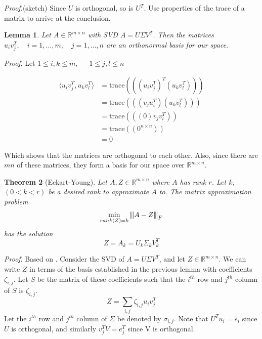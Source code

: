 \documentclass[a4paper]{article}
\newcommand{\norm}[1]{{\left\vert\kern-0.25ex\left\vert\kern-0.25ex\left\vert #1 
    \right\vert\kern-0.25ex\right\vert\kern-0.25ex\right\vert}}
\newcommand{\trace}[1]{\text{trace}(#1)}
\newtheorem{theorem}{Theorem}[section]
\newtheorem{lemma}[theorem]{Lemma}
\begin{document}
\textit{Proof.}(sketch)
Since $U$ is orthogonal, so is $U^T$.  Use properties of the trace of a matrix to arrive at the conclusion.



\begin{lemma}
Let $A \in \mathbb{R}^{m\times n}$ with SVD $A=U\Sigma V^T$.  Then the matrices 
$u_i v_j^T, \quad i=1,...,m, \quad j=1,...,n$
are an orthonormal basis for our space.
\end{lemma}
\textit{Proof}. Let $1 \leq i,k \leq m$, $\quad$ $1 \leq j,l \leq n$ 

\begin{align*}
\langle u_i v_j^T, u_k v_l^T  \rangle &= \trace{((u_i v_j^T)^T(u_k v_l^T))}\\
&= \trace{((v_j u_i^T)(u_k v_l^T))}\\
&= \trace{((0)v_j v_l^T)}\\
&= \trace{(0^{n \times n})}\\
&= 0
\end{align*}

Which shows that the matrices are orthogonal to each other.  Also, since there are $mn$ of these matrices, they form a basis for our space over $\mathbb{R}^{m\times n}$.

\begin{theorem}[Eckart-Young]
Let $A,Z\in \mathbb{R}^{m\times n}$ where $A$ has rank $r$. Let $k$, $(0<k<r)$ be a desired rank to approximate $A$ to. The matrix approximation problem
$$\min_{rank(Z)=k} \norm{A-Z}_F$$
has the solution
$$Z=A_k = U_k\Sigma _k V_k^T$$
\end{theorem}

\textit{Proof}.
Based on \cite{elden}.  Consider the SVD of $A=U\Sigma V^T$, and let $Z\in \mathbb{R}^{m\times n}$. We can write $Z$ in terms of the basis established in the previous lemma with coefficients $\zeta_{i,j}$.  Let $S$ be the matrix of these coefficients such that the $i^{th}$ row and $j^{th}$ column of $S$ is $\zeta_{i,j}$.
$$Z = \sum_{i,j} \zeta_{i,j} u_iv_j^T$$
Let the $i^{th}$ row and $j^{th}$ column of $\Sigma$ be denoted by $\sigma_{i,j}$.
Note that $U^Tu_i = e_i$ since $U$ is orthogonal, and similarly $v_j^TV = e_j^T$ since V is orthogonal.
\end{document}
